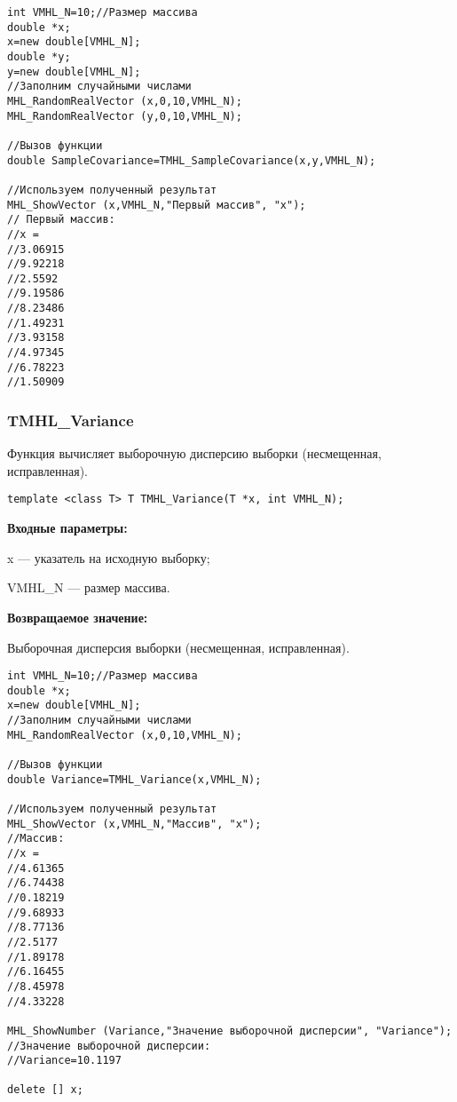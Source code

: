 \documentclass[a4paper,12pt]{article}
\begin{document}
\begin{lstlisting}[label=code_use_TMHL_SampleCovariance,caption=Пример использования]
int VMHL_N=10;//Размер массива
double *x;
x=new double[VMHL_N];
double *y;
y=new double[VMHL_N];
//Заполним случайными числами
MHL_RandomRealVector (x,0,10,VMHL_N);
MHL_RandomRealVector (y,0,10,VMHL_N);

//Вызов функции
double SampleCovariance=TMHL_SampleCovariance(x,y,VMHL_N);

//Используем полученный результат
MHL_ShowVector (x,VMHL_N,"Первый массив", "x");
// Первый массив:
//x =
//3.06915
//9.92218
//2.5592
//9.19586
//8.23486
//1.49231
//3.93158
//4.97345
//6.78223
//1.50909
\end{lstlisting}

\subsubsection{TMHL\_Variance}\label{TMHL_Variance}

Функция вычисляет выборочную дисперсию выборки (несмещенная, исправленная).


\begin{lstlisting}[label=code_syntax_TMHL_Variance,caption=Синтаксис]
template <class T> T TMHL_Variance(T *x, int VMHL_N);
\end{lstlisting}

\textbf{Входные параметры:}
 
x --- указатель на исходную выборку;
 
VMHL\_N --- размер массива.

\textbf{Возвращаемое значение:}
 
Выборочная дисперсия выборки (несмещенная, исправленная).


\begin{lstlisting}[label=code_use_TMHL_Variance,caption=Пример использования]
int VMHL_N=10;//Размер массива
double *x;
x=new double[VMHL_N];
//Заполним случайными числами
MHL_RandomRealVector (x,0,10,VMHL_N);

//Вызов функции
double Variance=TMHL_Variance(x,VMHL_N);

//Используем полученный результат
MHL_ShowVector (x,VMHL_N,"Массив", "x");
//Массив:
//x =
//4.61365
//6.74438
//0.18219
//9.68933
//8.77136
//2.5177
//1.89178
//6.16455
//8.45978
//4.33228

MHL_ShowNumber (Variance,"Значение выборочной дисперсии", "Variance");
//Значение выборочной дисперсии:
//Variance=10.1197

delete [] x;
\end{lstlisting}
\end{document}
